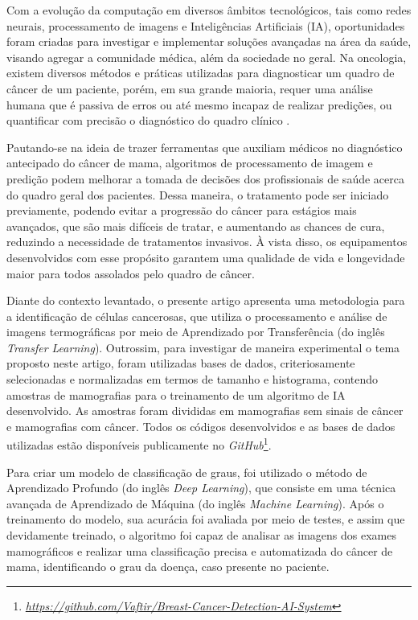 Com a evolução da computação em diversos âmbitos tecnológicos, tais como redes neurais, processamento de imagens e Inteligências Artificiais (IA), oportunidades foram criadas para investigar e implementar soluções avançadas na área da saúde, visando agregar a comunidade médica, além da sociedade no geral. Na oncologia, existem diversos métodos e práticas utilizadas para diagnosticar um quadro de câncer de um paciente, porém, em sua grande maioria, requer uma análise humana que é passiva de erros ou até mesmo incapaz de realizar predições, ou quantificar com precisão o diagnóstico do quadro clínico \cite{parametrization}.

Pautando-se na ideia de trazer ferramentas que auxiliam médicos no diagnóstico antecipado do câncer de mama, algoritmos de processamento de imagem e predição podem melhorar a tomada de decisões dos profissionais de saúde acerca do quadro geral dos pacientes. Dessa maneira, o tratamento pode ser iniciado previamente, podendo evitar a progressão do câncer para estágios mais avançados, que são mais difíceis de tratar, e aumentando as chances de cura, reduzindo a necessidade de tratamentos invasivos. À vista disso, os equipamentos desenvolvidos com esse propósito garantem uma qualidade de vida e longevidade maior para todos assolados pelo quadro de câncer.

Diante do contexto levantado, o presente artigo apresenta uma metodologia para a identificação de células cancerosas, que utiliza o processamento e análise de imagens termográficas por meio de Aprendizado por Transferência (do inglês \textit{Transfer Learning}). Outrossim, para investigar de maneira experimental o tema proposto neste artigo, foram utilizadas bases de dados, criteriosamente selecionadas e normalizadas em termos de tamanho e histograma, contendo amostras de mamografias para o treinamento de um algoritmo de IA desenvolvido. As amostras foram divididas em mamografias sem sinais de câncer e mamografias com câncer. Todos os códigos desenvolvidos e as bases de dados utilizadas estão disponíveis publicamente no \textit{GitHub}\footnote{\href{https://github.com/Vaftir/Breast-Cancer-Detection-AI-System}{\textit{https://github.com/Vaftir/Breast-Cancer-Detection-AI-System}}}.

Para criar um modelo de classificação de graus, foi utilizado o método de Aprendizado Profundo (do inglês \textit{Deep Learning}), que consiste em uma técnica avançada de Aprendizado de Máquina (do inglês \textit{Machine Learning}). Após o treinamento do modelo, sua acurácia foi avaliada por meio de testes, e assim que devidamente treinado, o algoritmo foi capaz de analisar as imagens dos exames mamográficos e realizar uma classificação precisa e automatizada do câncer de mama, identificando o grau da doença, caso presente no paciente.

